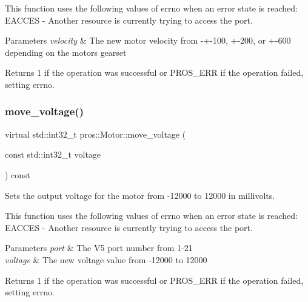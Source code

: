 This function uses the following values of errno when an error state is reached\+: E\+A\+C\+C\+ES -\/ Another resource is currently trying to access the port.


\begin{DoxyParams}{Parameters}
{\em velocity} & The new motor velocity from -\/+-\/100, +-\/200, or +-\/600 depending on the motor\textquotesingle{}s gearset\\
\hline
\end{DoxyParams}
\begin{DoxyReturn}{Returns}
1 if the operation was successful or P\+R\+O\+S\+\_\+\+E\+RR if the operation failed, setting errno. 
\end{DoxyReturn}
\mbox{\label{classpros_1_1Motor_a3c79db57c20617fbbc49461c58612cfb}} 
\subsubsection{\texorpdfstring{move\_voltage()}{move\_voltage()}}
{\footnotesize\ttfamily virtual std\+::int32\+\_\+t pros\+::\+Motor\+::move\+\_\+voltage (\begin{DoxyParamCaption}\item[{const std\+::int32\+\_\+t}]{voltage }\end{DoxyParamCaption}) const\hspace{0.3cm}{\ttfamily [virtual]}}



Sets the output voltage for the motor from -\/12000 to 12000 in millivolts. 

This function uses the following values of errno when an error state is reached\+: E\+A\+C\+C\+ES -\/ Another resource is currently trying to access the port.


\begin{DoxyParams}{Parameters}
{\em port} & The V5 port number from 1-\/21 \\
\hline
{\em voltage} & The new voltage value from -\/12000 to 12000\\
\hline
\end{DoxyParams}
\begin{DoxyReturn}{Returns}
1 if the operation was successful or P\+R\+O\+S\+\_\+\+E\+RR if the operation failed, setting errno. 
\end{DoxyReturn}
\mbox{\label{classpros_1_1Motor_a4cf8a9518eb6cd268d27151f0df7fd38}} 
